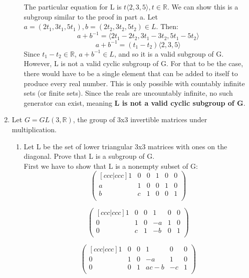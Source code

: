 \begin{enumerate}
\begin{enumerate}
    The particular equation for L is $t \langle 2,3,5 \rangle, t \in \mathds{R}$. We can show this is a subgroup similar to the proof in part a. Let $a=(2t_1,3t_1,5t_1),b=(2t_2,3t_2,5t_2) \in L$. Then:
    $$a + b^{-1} = \langle 2t_1-2t_2,3t_1-3t_2,5t_1-5t_2 \rangle$$
    $$a + b^{-1} = (t_1-t_2) \langle 2,3,5 \rangle$$
    Since $t_1-t_2 \in \mathds{R}$, $a + b^{-1} \in L$, and so it is a valid subgroup of G.\\
    However, L is not a valid cyclic subgroup of G. For that to be the case, there would have to be a single element that can be added to itself to produce every real number. This is only possible with countably infinite sets (or finite sets). Since the reals are uncountably infinite, no such generator can exist, meaning \textbf{L is not a valid cyclic subgroup of G}.

    
  \end{enumerate}

  \item
      Let $G = GL(3,\mathds{R})$, the group of 3x3 invertible matrices under multiplication.
    \begin{enumerate}
    \item
      Let L be the set of lower triangular 3x3 matrices with ones on the diagonal. Prove that L is a subgroup of G.\\

      First we have to show that L is a nonempty subset of G:
      $$
      \begin{pmatrix}[ccc|ccc]
        1 & 0 & 0 & 1 & 0 & 0\\
        a & 1 & 0 & 0 & 1 & 0\\
        b & c & 1 & 0 & 0 & 1\\
      \end{pmatrix}
      $$
      
      $$
      \begin{pmatrix}[ccc|ccc]
        1 & 0 & 0 &  1 & 0 & 0\\
        0 & 1 & 0 & -a & 1 & 0\\
        0 & c & 1 & -b & 0 & 1\\
      \end{pmatrix}
      $$

      $$
      \begin{pmatrix}[ccc|ccc]
        1 & 0 & 0 &  1 & 0 & 0\\
        0 & 1 & 0 & -a & 1 & 0\\
        0 & 0 & 1 & ac-b & -c & 1\\
      \end{pmatrix}
      $$


\end{enumerate}
\end{enumerate}
